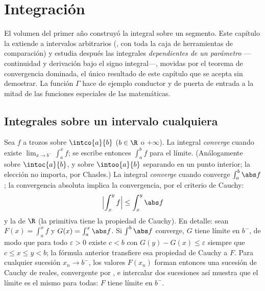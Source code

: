 \chapter{Integración}\label{ch:b2:integration}

El volumen del primer año construyó la integral sobre un segmento.
Este capítulo la extiende a intervalos arbitrarios (, con toda la caja de herramientas de comparación) y estudia
después las integrales \emph{dependientes de un parámetro}
---continuidad y derivación bajo el signo integral---, movidas por el
teorema de convergencia dominada, el único resultado de este capítulo
que se acepta sin demostrar. La función $\Gamma$ hace de ejemplo
conductor y de puerta de entrada a la mitad de las funciones especiales
de las matemáticas.

\section{Integrales sobre un intervalo cualquiera}

\begin{definition}\label{def:b2:integration:improper}
Sea $f$  a trozos sobre $\intco{a}{b}$ ($b \in \R$ o
$+\infty$). La integral \emph{converge}
cuando existe $\lim_{x \to b^-} \int_a^x f$; se escribe entonces
$\int_a^b f$ para el límite. (Análogamente sobre $\intoc{a}{b}$, y
sobre $\intoo{a}{b}$ separando en un punto interior; la elección no
importa, por Chasles.) La integral \emph{converge }
cuando converge $\int_a^b \abs f$; la convergencia absoluta implica
la convergencia, por el criterio de Cauchy:
\[
\Bigl| \int_x^{y} f \Bigr| \leq \int_x^{y} \abs f
\]
y la  de $\R$ (la primitiva tiene la propiedad de
Cauchy). En detalle: sean $F(x) = \int_a^x f$ y $G(x) = \int_a^x
\abs f$. Si $\int^b\abs f$ converge, $G$ tiene límite en $b^-$, de
modo que para todo $\varepsilon > 0$ existe $c < b$ con $G(y) - G(x)
\leq \varepsilon$ siempre que $c \leq x \leq y < b$; la fórmula
anterior transfiere esa propiedad de Cauchy a $F$. Para cualquier
sucesión $x_n \to b^-$, los valores $F(x_n)$ forman entonces una
sucesión de Cauchy de reales, convergente por , e
intercalar dos sucesiones así muestra que el límite es el mismo para
todas: $F$ tiene límite en $b^-$.
\end{definition}

